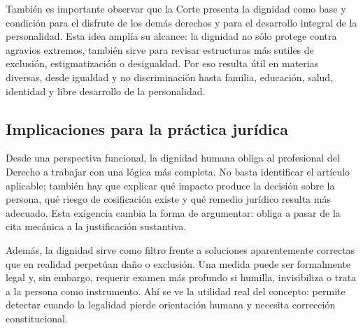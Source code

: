 \documentclass[
	spanish,
	letterpaper, oneside
]{article}
\begin{document}
También es importante observar que la Corte presenta la dignidad como base y condición para el disfrute de los demás derechos y para el desarrollo integral de la personalidad. Esta idea amplía su alcance: la dignidad no sólo protege contra agravios extremos, también sirve para revisar estructuras más sutiles de exclusión, estigmatización o desigualdad. Por eso resulta útil en materias diversas, desde igualdad y no discriminación hasta familia, educación, salud, identidad y libre desarrollo de la personalidad.
\subsection{Implicaciones para la práctica jurídica}

Desde una perspectiva funcional, la dignidad humana obliga al profesional del Derecho a trabajar con una lógica más completa. No basta identificar el artículo aplicable; también hay que explicar qué impacto produce la decisión sobre la persona, qué riesgo de cosificación existe y qué remedio jurídico resulta más adecuado. Esta exigencia cambia la forma de argumentar: obliga a pasar de la cita mecánica a la justificación sustantiva.

Además, la dignidad sirve como filtro frente a soluciones aparentemente correctas que en realidad perpetúan daño o exclusión. Una medida puede ser formalmente legal y, sin embargo, requerir examen más profundo si humilla, invisibiliza o trata a la persona como instrumento. Ahí se ve la utilidad real del concepto: permite detectar cuando la legalidad pierde orientación humana y necesita corrección constitucional.
\end{document}
